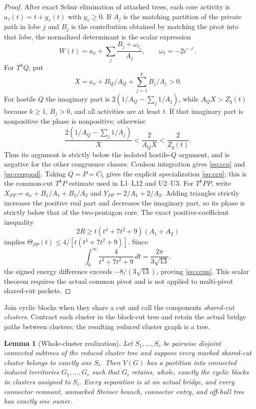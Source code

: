 \documentclass[11pt]{article}
\newtheorem{lemma}[theorem]{Lemma}
\begin{document}
\begin{proof}
After exact Schur elimination of attached trees, each core activity is
$a_v(t)=t+y_v(t)$ with $y_v\geq0$.  If $A_j$ is the matching partition of
the private path in lobe $j$ and $B_j$ is the contribution obtained by
matching the pivot into that lobe, the normalized determinant is the scalar
expression
\[
 W(t)=a_x+\sum_j\frac{B_j+\omega_{\ell_j}}{A_j},
 \qquad \omega_\ell=-2i^{-\ell}.
\]
For $T^kQ$, put
\[
 X=a_x+B_Q/A_Q+\sum_{j=1}^kB_j/A_j>0.
\]
For hostile $Q$ the imaginary part is
$2(1/A_Q-\sum_j1/A_j)$, while $A_QX>Z_q(t)$ because $k\geq1$, $B_j>0$, and
all activities are at least $t$.  If that imaginary part is nonpositive the
phase is nonpositive; otherwise
\[
 \frac{2(1/A_Q-\sum_j1/A_j)}X<\frac2{A_QX}<\frac2{Z_q(t)}.
\]
Thus its argument is strictly below the isolated hostile-$Q$ argument, and is
negative for the other congruence classes.  Coulson integration gives
\eqref{eq:ccq} and \eqref{eq:ccqgood}.  Taking $Q=P=C_5$ gives the explicit
specialization \eqref{eq:ccp}; this is the common-cut $T^kP$ estimate used in
L1--L12 and U2--U3.  For $T^kPP$, write
$X_{PP}=a_x+B_1/A_1+B_2/A_2$ and $Y_{PP}=2/A_1+2/A_2$.
Adding triangles strictly increases the positive real part and decreases the
imaginary part, so its phase is strictly below that of the two-pentagon core.
The exact positive-coefficient inequality
\[
 2R\geq t(t^4+7t^2+9)(A_1+A_2)
\]
implies
$\Theta_{PP}(t)\leq4/[t(t^4+7t^2+9)]$.  Since
\[
 \int_0^\infty\frac4{t^4+7t^2+9}\,dt=\frac{2\pi}{3\sqrt{13}},
\]
the signed energy difference exceeds $-8/(3\sqrt{13})$, proving
\eqref{eq:ccpp}.  This scalar theorem requires the actual common pivot and is
not applied to multi-pivot shared-cut packets.
\end{proof}

Join cyclic blocks when they share a cut and call the components
\emph{shared-cut clusters}.  Contract each cluster in the block-cut tree and
retain the actual bridge paths between clusters; the resulting reduced cluster
graph is a tree.

\begin{lemma}[Whole-cluster realization]\label{lem:whole-cluster}
Let $S_1,\ldots,S_r$ be pairwise disjoint connected subtrees of the reduced
cluster tree and suppose every marked shared-cut cluster belongs to exactly one
$S_i$.  Then $V(G)$ has a partition into connected induced territories
$G_1,\ldots,G_r$ such that $G_i$ retains, whole, exactly the cyclic blocks in
clusters assigned to $S_i$.  Every separation is at an actual bridge, and
every connector remnant, unmarked Steiner branch, connector entry, and
off-hull tree has exactly one owner.
\end{lemma}
\end{document}

